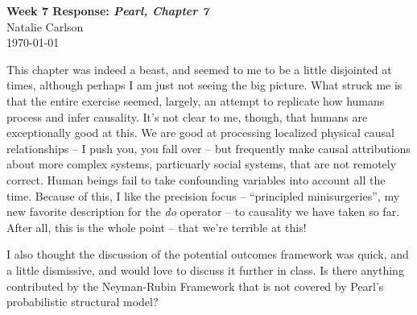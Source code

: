 \documentclass[12pt]{article}
\begin{document}
\begin{center}
  \Large \textbf{Week 7 Response: \textit{Pearl, Chapter 7}} \\
  \vspace{0.1in}
  \normalsize Natalie Carlson \\
  \today
\end{center}

This chapter was indeed a beast, and seemed to me to be a little disjointed at times, although perhaps I am just not seeing the big picture. What struck me is that the entire exercise seemed, largely, an attempt to replicate how humans process and infer causality. It's not clear to me, though, that humans are exceptionally good at this. We are good at processing localized physical causal relationships -- I push you, you fall over -- but frequently make causal attributions about more complex systems, particuarly social systems, that are not remotely correct. Human beings fail to take confounding variables into account all the time. Because of this, I like the precision focus -- ``principled minisurgeries'', my new favorite description for the \textit{do} operator -- to causality we have taken so far. After all, this is the whole point -- that we're terrible at this! 

I also thought the discussion of the potential outcomes framework was quick, and a little dismissive, and would love to discuss it further in class. Is there anything contributed by the Neyman-Rubin Framework that is not covered by Pearl's probabilistic structural model? 
\end{document}
